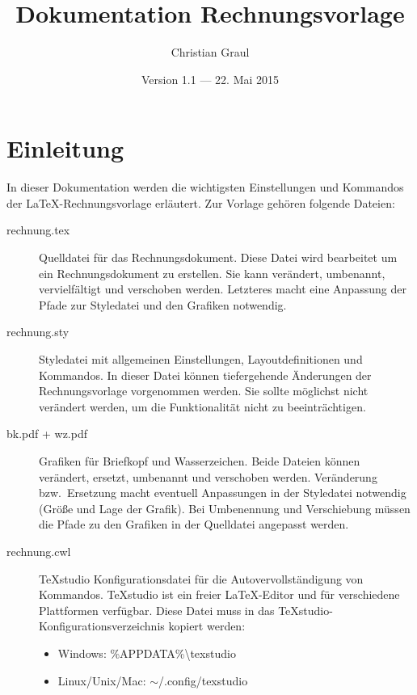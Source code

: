 \documentclass[11pt,pdftex]{scrartcl}
\title{Dokumentation Rechnungsvorlage}
\author{Christian Graul}
\date{Version 1.1 --- 22. Mai 2015}
\makeatletter
\newcommand{\verbatimfont}[1]{\renewcommand{\verbatim@font}{\ttfamily#1}}
\makeatother
\begin{document}
\maketitle{}
\tableofcontents
\verbatimfont{\small}

\vspace{.5cm}

\section{Einleitung}

In dieser Dokumentation werden die wichtigsten Einstellungen und Kommandos der \LaTeX-Rech\-nungs\-vorlage erläutert. Zur Vorlage gehören folgende Dateien:
\begin{description}
\item[rechnung.tex] Quelldatei für das Rechnungsdokument. Diese Datei wird bearbeitet um ein Rechnungsdokument zu erstellen. Sie kann verändert, umbenannt, vervielfältigt und verschoben werden. Letzteres macht eine Anpassung der Pfade zur Styledatei und den Grafiken notwendig.
\item[rechnung.sty] Styledatei mit allgemeinen Einstellungen, Layoutdefinitionen und Kommandos. In dieser Datei können tiefergehende Änderungen der Rechnungsvorlage vorgenommen werden. Sie sollte möglichst nicht verändert werden, um die Funktionalität nicht zu beeinträchtigen.
\item[bk.pdf + wz.pdf] Grafiken für Briefkopf und Wasserzeichen. Beide Dateien können verändert, ersetzt, umbenannt und verschoben werden. Veränderung bzw.~Ersetzung macht eventuell Anpassungen in der Styledatei notwendig (Größe und Lage der Grafik). Bei Umbenennung und Verschiebung müssen die Pfade zu den Grafiken in der Quelldatei angepasst werden.
\item[rechnung.cwl] TeXstudio Konfigurationsdatei für die Autovervollständigung von Kommandos. TeXstudio ist ein freier \LaTeX-Editor und für verschiedene Plattformen verfügbar. Diese Datei muss in das TeXstudio-Konfigurationsverzeichnis kopiert werden:
\begin{itemize}
\item Windows: \%APPDATA\%\textbackslash texstudio 

\vspace{-0.3em}

\item Linux/Unix/Mac: $\sim$/.config/texstudio
\end{itemize} 
\end{description}
\end{document}
